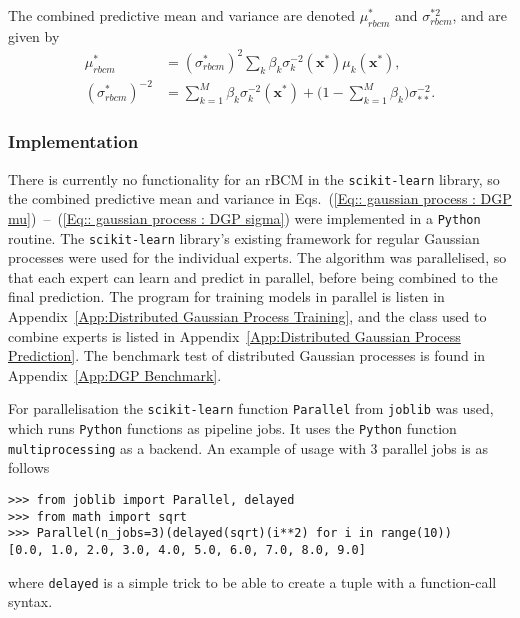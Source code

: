 \documentclass[twoside,english]{uiofysmaster}
\begin{document}
{{The combined predictive mean and variance are denoted $\mu_{rbcm}^*$ and $\sigma^{*2}_{rbcm}$, and are given by
\begin{align}
\mu^*_{rbcm} &= (\sigma^*_{rbcm})^2 \sum_k \beta_k \sigma_k^{-2} (\textbf{x}^*) \mu_k (\textbf{x}^*),\label{Eq:: gaussian process : DGP mu} \\
(\sigma^*_{rbcm})^{-2} &= \sum_{k=1}^M \beta_k \sigma_k^{-2} (\textbf{x}^*) + \big(1 - \sum_{k=1}^M \beta_k \big) \sigma_{**}^{-2}.\label{Eq:: gaussian process : DGP sigma}
\end{align}


\subsubsection{Implementation}

There is currently no functionality for an rBCM in the \verb|scikit-learn| library, so the combined predictive mean and variance in Eqs.~(\ref{Eq:: gaussian process : DGP mu})~--~(\ref{Eq:: gaussian process : DGP sigma}) were implemented in a \verb|Python| routine. The \verb|scikit-learn| library's existing framework for regular Gaussian processes were used for the individual experts. The algorithm was parallelised, so that each expert can learn and predict in parallel, before being combined to the final prediction. The program for training models in parallel is listen in Appendix~\ref{App:Distributed Gaussian Process Training}, and the class used to combine experts is listed in Appendix~\ref{App:Distributed Gaussian Process Prediction}. The benchmark test of distributed Gaussian processes is found in Appendix~\ref{App:DGP Benchmark}.  


For parallelisation the \verb|scikit-learn| function \verb|Parallel| from \verb|joblib| was used, which runs \verb|Python| functions as pipeline jobs. It uses the \verb|Python| function \verb|multiprocessing| as a backend. An example of usage with 3 parallel jobs is as follows
\begin{lstlisting}
>>> from joblib import Parallel, delayed
>>> from math import sqrt
>>> Parallel(n_jobs=3)(delayed(sqrt)(i**2) for i in range(10))
[0.0, 1.0, 2.0, 3.0, 4.0, 5.0, 6.0, 7.0, 8.0, 9.0]
\end{lstlisting}
where \verb|delayed| is a simple trick to be able to create a tuple with a function-call syntax.


}}
\end{document}
